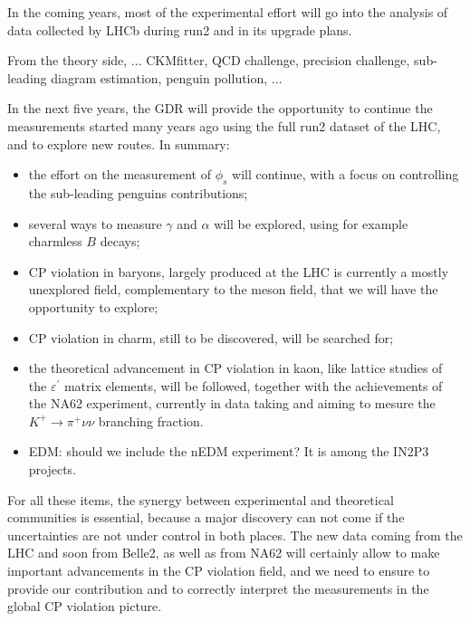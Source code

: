 
In the coming years, most of the experimental effort will go into the analysis of data collected by  LHCb during run2 and in its
upgrade plans. 


From the theory side, ... CKMfitter, QCD challenge, precision challenge,
sub-leading diagram estimation, penguin pollution, ...

In the next five years, the GDR   will provide the opportunity to continue the
measurements started many years ago using the full run2 dataset of the LHC,
and to explore new routes. In summary:

\begin{itemize}
\item the effort on the measurement of $\phi_{s}$ will continue, with a focus on controlling the sub-leading penguins contributions;
\item several ways to measure $\gamma$ and $\alpha$ will be explored, using for example charmless $B$ decays;
\item CP violation in baryons, largely produced at the LHC  is currently a mostly unexplored field, complementary to the meson field, that we will have the opportunity to explore;
\item CP violation in charm,  still to be discovered, will be searched for;
\item the theoretical advancement in CP violation in kaon, like  lattice studies of the $\varepsilon^{\prime}$ matrix elements, will be followed, together with the achievements of the  NA62 experiment, currently in data taking and aiming to mesure the  $K^{+}%
\rightarrow\pi^{+}\nu\nu$ branching fraction.
\item EDM: should we include the nEDM experiment? It is among the IN2P3 projects.
\end{itemize}

For all these items, the synergy between experimental and theoretical communities is essential, because a major discovery can not come if the uncertainties are not under control in both places. The new data coming from the LHC and soon from Belle2, as well as from NA62 will certainly allow to make important advancements in the CP violation field, and we need to ensure to provide our contribution and to correctly interpret the measurements in the global CP violation picture. 

